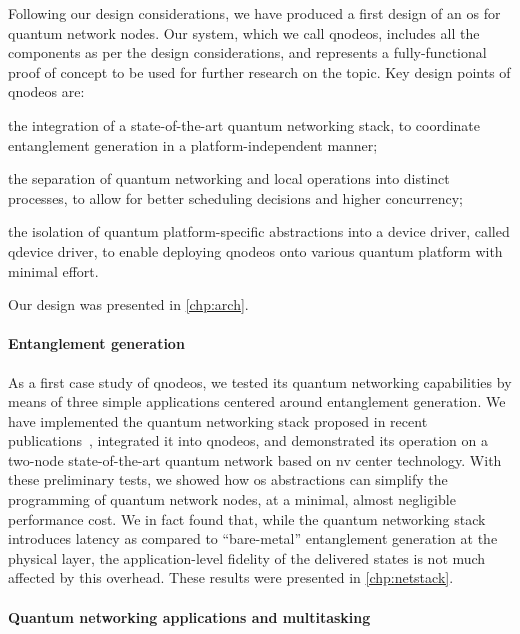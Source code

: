 Following our design considerations, we have produced a first design of an \acrshort{os} for quantum
network nodes. Our system, which we call \acrshort{qnodeos}, includes all the components as per the
design considerations, and represents a fully-functional proof of concept to be used for further
research on the topic. Key design points of \acrshort{qnodeos} are:
\begin{inlinelist}
    \item the integration of a state-of-the-art quantum networking stack, to coordinate entanglement
          generation in a platform-independent manner;
    \item the separation of quantum networking and local operations into distinct processes, to
          allow for better scheduling decisions and higher concurrency;
    \item the isolation of quantum platform-specific abstractions into a device driver, called
          \acrshort{qdevice} driver, to enable deploying \acrshort{qnodeos} onto various quantum
          platform with minimal effort.
\end{inlinelist}
Our design was presented in \cref{chp:arch}.

\paragraph{Entanglement generation}

As a first case study of \acrshort{qnodeos}, we tested its quantum networking capabilities by means
of three simple applications centered around entanglement generation. We have implemented the
quantum networking stack proposed in recent publications~\cite{dahlberg_2019_egp,
kozlowski_2020_qnp}, integrated it into \acrshort{qnodeos}, and demonstrated its operation on a
two-node state-of-the-art quantum network based on \acrlong{nv} center technology. With these
preliminary tests, we showed how \acrshort{os} abstractions can simplify the programming of quantum
network nodes, at a minimal, almost negligible performance cost. We in fact found that, while the
quantum networking stack introduces latency as compared to ``bare-metal'' entanglement generation at
the physical layer, the application-level fidelity of the delivered states is not much affected by
this overhead. These results were presented in \cref{chp:netstack}.

\paragraph{Quantum networking applications and multitasking}

